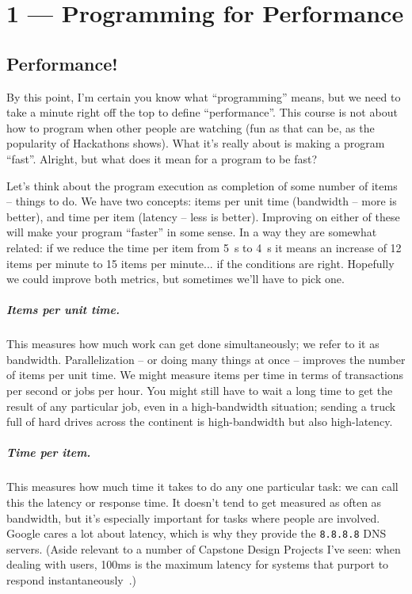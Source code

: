 \documentclass[a4paper]{report}
\begin{document}
\tableofcontents


\chapter*{1 --- Programming for Performance}


\section*{Performance!}
By this point, I'm certain you know what ``programming'' means, but we need to take a minute right off the top to define ``performance''. This course is not about how to program when other people are watching (fun as that can be, as the popularity of Hackathons shows). What it's really about is making a program ``fast''. Alright, but what does it mean for a program to be fast?

Let's think about the program execution as completion of some number of items -- things to do. We have two concepts: items per unit time (bandwidth -- more is better), and time per item (latency -- less is better). Improving on either of these will make your program ``faster'' in some sense. In a way they are somewhat related: if we reduce the time per item from 5~s to 4~s it means an increase of 12 items per minute to 15 items per minute... if the conditions are right. Hopefully we could improve both metrics, but sometimes we'll have to pick one.

\paragraph{Items per unit time.} This measures how much work can get 
done simultaneously; we refer to it as bandwidth.
Parallelization -- or doing many things at once -- improves the number
of items per unit time. We might measure items per time in terms of
transactions per second or jobs per hour. You might still have to wait
a long time to get the result of any particular job, even in a
high-bandwidth situation; sending a truck full of hard drives across
the continent is high-bandwidth but also high-latency.

\paragraph{Time per item.} This measures how much time it takes to do
any one particular task: we can call this the latency or response time.
It doesn't tend to get measured as often as bandwidth, but it's especially
important for tasks where people are involved. Google cares a lot about
latency, which is why they provide the {\tt 8.8.8.8} DNS servers.
(Aside relevant to a number of Capstone Design Projects I've seen:
when dealing with users, 100ms is the maximum latency for
systems that purport to respond instantaneously~\cite{nielsen93:_respon_times}.)
\end{document}
